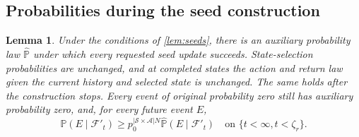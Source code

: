 \documentclass[twoside,11pt]{article}
\newtheorem{lemma}[lemma]{Lemma}
\DeclareRobustCommand{\reviewbarstart}{%
  \ifhmode %
    \vadjust{\vbox to 0pt{%
      \vskip-\ht\strutbox %
      \vskip-\dp\strutbox %
      \cbstart[\changebarwidth] %
      \vss %
    }}%
  \else %
    \cbstart[\changebarwidth]%
  \fi %
} %
\providecommand{\DIFadd}[1]{#1} %
\providecommand{\DIFaddbegin}{\reviewbarstart} %
\def\DIFadd#1{#1}%
\def\DIFaddbegin{}%
\begin{document}
\DIFaddbegin \subsection{\DIFadd{Probabilities during the seed construction}}
\label{app: seed law}
\begin{lemma}
\label{lem:measure}
\DIFadd{Under the conditions of \autoref{lem:seeds}, there is an auxiliary probability law $\widehat{\mathbb P}$ under which every requested seed update succeeds. State-selection probabilities are unchanged, and at completed states the action and return law given the current history and selected state is unchanged. The same holds after the construction stops. Every event of original probability zero still has auxiliary probability zero, and, for every future event $E$,
}\[
\DIFadd{\mathbb P(E\mid\mathcal F'_t)
\ge p_0^{|\mathcal S\times\mathcal A|N}\widehat{\mathbb P}(E\mid\mathcal F'_t)
\quad\text{on }\{t<\infty,t<\zeta_r\}.
}\]
\end{lemma}
\end{document}
